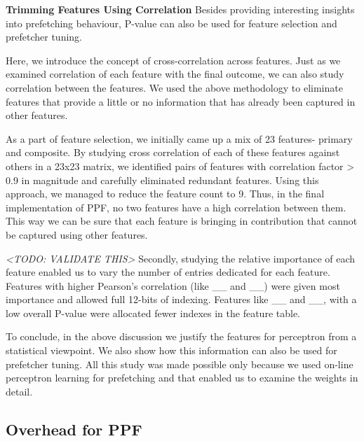 \textbf{Trimming Features Using Correlation} \newline Besides
providing interesting insights into prefetching behaviour, P-value can
also be used for feature selection and prefetcher tuning.

Here, we introduce the concept of cross-correlation across features.
Just as we examined correlation of each feature with the final
outcome, we can also study correlation between the features.  We used
the above methodology to eliminate features that provide a little or
no information that has already been captured in other features.

As a part of feature selection, we initially came up a mix of 23
features- primary and composite.  By studying cross correlation of
each of these features against others in a 23x23 matrix, we identified
pairs of features with correlation factor > 0.9 in magnitude and
carefully eliminated redundant features.  Using this approach, we
managed to reduce the feature count to 9.  Thus, in the final
implementation of PPF, no two features have a high correlation
between them.  This way we can be sure that each feature is bringing
in contribution that cannot be captured using other features.

\textit{<TODO: VALIDATE THIS>} Secondly, studying the relative
importance of each feature enabled us to vary the number of entries
dedicated for each feature.  Features with higher Pearson's
correlation (like \_\_ and \_\_) were given most importance and
allowed full 12-bits of indexing.  Features like \_\_ and \_\_, with a
low overall P-value were allocated fewer indexes in the feature table.

To conclude, in the above discussion we justify the features for
perceptron from a statistical viewpoint.  We also show how this
information can also be used for prefetcher tuning.  All this study
was made possible only because we used on-line perceptron learning for
prefetching and that enabled us to examine the weights in detail.


\subsection{Overhead for PPF}
\label{Method-Overheads}


